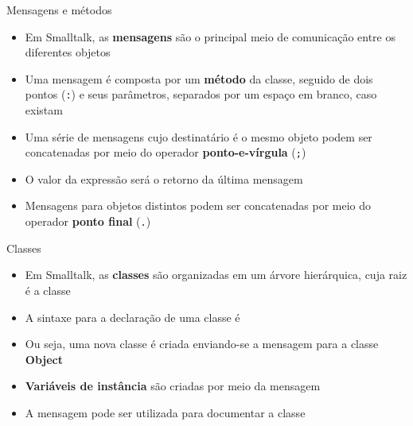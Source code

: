 \begin{frame}[fragile]{Mensagens e métodos}

    \begin{itemize}
        \item Em Smalltalk, as \textbf{mensagens} são o principal meio de comunicação entre os
            diferentes objetos

        \item Uma mensagem é composta por um \textbf{método} da classe, seguido de dois pontos 
            (\texttt{:}) e seus parâmetros, separados por um espaço em branco, caso existam

        \item Uma série de mensagens cujo destinatário é o mesmo objeto podem ser concatenadas
            por meio do operador \textbf{ponto-e-vírgula} (\texttt{;})
 
        \item O valor da expressão será o retorno da última mensagem


        \item Mensagens para objetos distintos podem ser concatenadas por meio do operador
            \textbf{ponto final} (\texttt{.})

    \end{itemize}

\end{frame}

\begin{frame}[fragile]{Classes}

    \begin{itemize}
        \item Em Smalltalk, as \textbf{classes} são organizadas em um árvore hierárquica, cuja
            raiz é a classe 

        \item A sintaxe para a declaração de uma classe é


        \item Ou seja, uma nova classe é criada enviando-se a mensagem 
            para a classe \textbf{Object}

        \item \textbf{Variáveis de instância} são criadas por meio da mensagem 


        \item A mensagem  pode ser utilizada para documentar a classe
 
    \end{itemize}

\end{frame}

